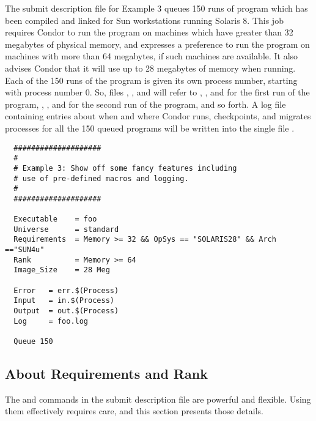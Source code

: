 The submit description file for Example 3 queues 150
runs of program  which has been compiled and linked for
Sun workstations running Solaris 8.
This job requires Condor to run the program on machines which have
greater than 32 megabytes of physical memory, and expresses a
preference to run the program on machines with more than 64 megabytes,
if such machines are available.  It also advises Condor that it will
use up to 28 megabytes of memory when running.
Each of the 150 runs of the program is given its own process number,
starting with process number 0.
So, files 
, , and  will
refer to , , and  for the first run
of the program,
, ,
and  for the second run of the program, and so forth.
A log file containing entries
about when and where Condor runs, checkpoints, and migrates processes for
all the 150 queued programs
will be written into the single file .
\begin{verbatim}
  ####################                    
  #
  # Example 3: Show off some fancy features including
  # use of pre-defined macros and logging.
  #
  ####################                                                    

  Executable    = foo                                                    
  Universe      = standard                                                    
  Requirements  = Memory >= 32 && OpSys == "SOLARIS28" && Arch =="SUN4u"     
  Rank          = Memory >= 64
  Image_Size    = 28 Meg                                                 

  Error   = err.$(Process)                                                
  Input   = in.$(Process)                                                 
  Output  = out.$(Process)                                                
  Log     = foo.log

  Queue 150
\end{verbatim}


\subsection{\label{sec:user-man-req-and-rank}About Requirements and Rank}

The 
 and  commands in the submit description file
are powerful and flexible. 
Using them effectively requires care, and this section presents
those details.

